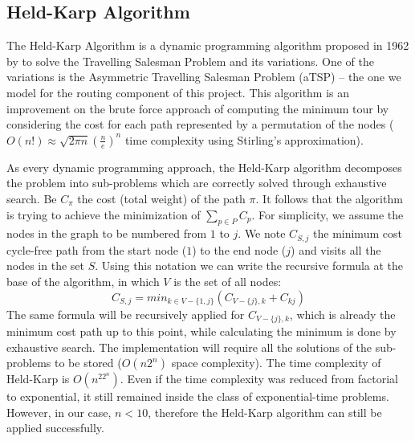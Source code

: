 \documentclass[11pt,a4paper,oneside]{article}
\begin{document}
\subsection{Held-Karp Algorithm}
The Held-Karp Algorithm is a dynamic programming algorithm proposed in 1962 by \citeauthor{held_DynamicProgrammingApproach_1962} to solve the Travelling Salesman Problem and its variations. One of the variations is the Asymmetric Travelling Salesman Problem (aTSP) -- the one we model for the routing component of this project.\cite{held_DynamicProgrammingApproach_1962} This algorithm is an improvement on the brute force approach of computing the minimum tour by considering the cost for each path represented by a permutation of the nodes ($O(n!) \approx \sqrt{2 \pi n}(\frac{n}{e})^n$ time complexity using Stirling's approximation).

As every dynamic programming approach, the Held-Karp algorithm decomposes the problem into sub-problems which are correctly solved through exhaustive search. Be $C_\pi$ the cost (total weight) of the path $\pi$. It follows that the algorithm is trying to achieve the minimization of $\sum_{p \in P}C_p$. For simplicity, we assume the nodes in the graph to be numbered from $1$ to $j$. We note $C_{S, j}$ the minimum cost cycle-free path from the start node ($1$) to the end node ($j$) and visits all the nodes in the set $S$. Using this notation we can write the recursive formula at the base of the algorithm, in which $V$ is the set of all nodes:
\begin{equation}
C_{S, j} = min_{k \in V - \{1, j\}}(C_{V - \{j\}, k} + C_{kj})
\end{equation}
The same formula will be recursively applied for $C_{V - \{j\}, k}$, which is already the minimum cost path up to this point, while calculating the minimum is done by exhaustive search. The implementation will require all the solutions of the sub-problems to be stored ($O(n2^n)$ space complexity). The time complexity of Held-Karp is $O(n^22^n)$. Even if the time complexity was reduced from factorial to exponential, it still remained inside the class of exponential-time problems. However, in our case, $n < 10$, therefore the Held-Karp algorithm can still be applied successfully.
\end{document}
